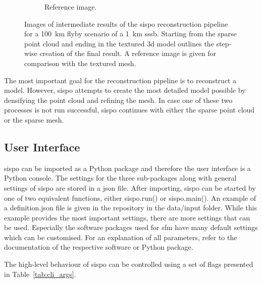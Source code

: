 \begin{figure}[htb]
\begin{subfigure}[b]{0.46\textwidth}
        \caption{Reference image.}
        \label{fig:recon_step_img}
    \end{subfigure}
    \caption{Images of intermediate results of the \gls{sispo} reconstruction pipeline for a \SI{100}{\kilo\meter} flyby scenario of a \SI{1}{\kilo\meter} \gls{sssb}. Starting from the sparse point cloud and ending in the textured \gls{3d} model outlines the step-wise creation of the final result. A reference image is given for comparison with the textured mesh.}
    \label{fig:recon_steps}
\end{figure}

The most important goal for the reconstruction pipeline is to reconstruct a model. However, \gls{sispo} attempts to create the most detailed model possible by densifying the point cloud and refining the mesh. In case one of these two processes is not run successful, \gls{sispo} continues with either the sparse point cloud or the sparse mesh.

\subsection{User Interface}
\Gls{sispo} can be imported as a Python package and therefore the user interface is a Python console. The settings for the three sub-packages along with general settings of \gls{sispo} are stored in a \gls{json} file. After importing, \gls{sispo} can be started by one of two equivalent functions, either sispo.run() or sispo.main(). An example of a definition.json file is given in the repository in the data/input folder. While this example provides the most important settings, there are more settings that can be used. Especially the software packages used for \gls{sfm} have many default settings which can be customised. For an explanation of all parameters, refer to the documentation of the respective software or Python package.

The high-level behaviour of \gls{sispo} can be controlled using a set of flags presented in Table~\ref{tab:cli_args}.

